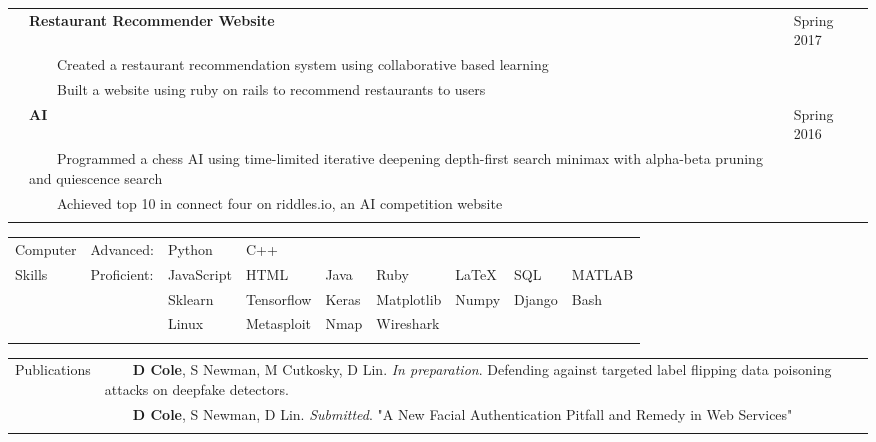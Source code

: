 \documentclass[10.5pt, arial]{article}
\newcommand{\tabitem}{~~\llap{\textbullet}~~}
\begin{document}
\begin{tabular}{p{1.5cm} p{13.2cm} l}
                & \textbf{Restaurant Recommender Website}                       & Spring 2017             \\
                & \tabitem Created a restaurant recommendation system using collaborative based learning    &   \\
                & \tabitem Built a website using ruby on rails to recommend restaurants to users            &   \\

                & \textbf{AI}                                             & Spring 2016   \\
                & \tabitem Programmed a chess AI using time-limited iterative deepening depth-first search minimax with alpha-beta pruning and quiescence search & \\
                & \tabitem Achieved top 10 in connect four on riddles.io, an AI competition website & \\ 
\\
\end{tabular}


\begin{tabular}{p{1.5cm} l l l l l l l l}
Computer	& Advanced: 	& Python 	& C++    	& 			& 			& 			& 				&           \\
Skills		& Proficient:	& JavaScript& HTML      & Java      & Ruby      & \LaTeX    & SQL           & MATLAB    \\
            &			 	& Sklearn   & Tensorflow& Keras     & Matplotlib& Numpy     & Django        & Bash      \\
            &               & Linux     & Metasploit& Nmap      & Wireshark &           &               &           \\
\\
\end{tabular}

\begin{tabular}{p{1.5cm} p{16.5cm}}
    Publications    & \tabitem \textbf{D Cole}, S Newman, M Cutkosky, D Lin. \textit{In preparation}. Defending against targeted label flipping data poisoning attacks on deepfake detectors. \\
                    & \tabitem \textbf{D Cole}, S Newman, D Lin. \textit{Submitted}. "A New Facial Authentication Pitfall and Remedy in Web Services" \\ \\
\end{tabular}
\end{document}
